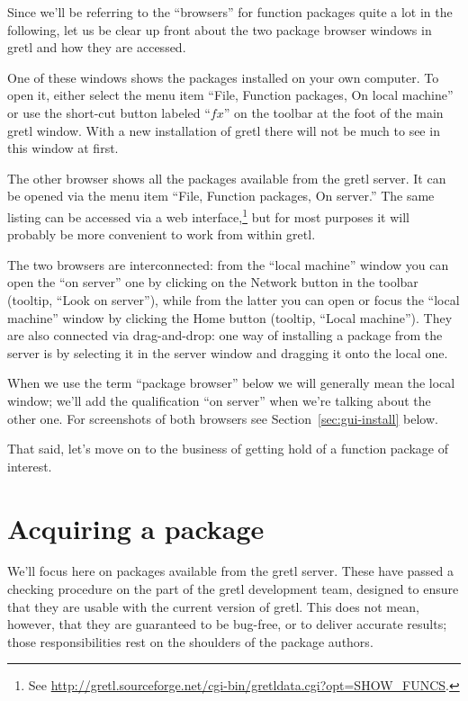\documentclass[oneside]{book}
\begin{document}
Since we'll be referring to the ``browsers'' for function packages
quite a lot in the following, let us be clear up front about the two
package browser windows in gretl and how they are accessed.

One of these windows shows the packages installed on your own
computer. To open it, either select the menu item ``File, Function
packages, On local machine'' or use the short-cut button labeled
``$fx$'' on the toolbar at the foot of the main gretl
window. With a new installation of gretl there will not be much to see
in this window at first.

The other browser shows all the packages available from the gretl
server. It can be opened via the menu item ``File, Function packages,
On server.'' The same listing can be accessed via a web
interface,\footnote{See
  \url{http://gretl.sourceforge.net/cgi-bin/gretldata.cgi?opt=SHOW_FUNCS}.}
but for most purposes it will probably be more convenient to work from
within gretl.

The two browsers are interconnected: from the ``local machine'' window
you can open the ``on server'' one by clicking on the Network button
in the toolbar (tooltip, ``Look on server''), while from the latter
you can open or focus the ``local machine'' window by clicking the
Home button (tooltip, ``Local machine''). They are also connected via
drag-and-drop: one way of installing a package from the server is by
selecting it in the server window and dragging it onto the local one.

When we use the term ``package browser'' below we will generally mean
the local window; we'll add the qualification ``on server'' when we're
talking about the other one. For screenshots of both browsers see
Section~\ref{sec:gui-install} below.

That said, let's move on to the business of getting hold of a function
package of interest.

\section{Acquiring a package}
\label{sec:acquire}

We'll focus here on packages available from the gretl server. These
have passed a checking procedure on the part of the gretl development
team, designed to ensure that they are usable with the current version
of gretl. This does not mean, however, that they are guaranteed to be
bug-free, or to deliver accurate results; those responsibilities rest
on the shoulders of the package authors.
\end{document}
